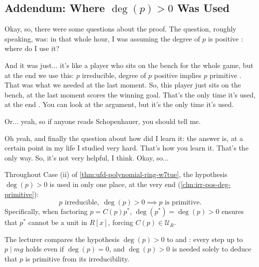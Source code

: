 \subsection{Addendum: Where \texorpdfstring{$\deg(p) > 0$}{deg(p) > 0} Was Used}

\begin{speech}[00:43:02 - 00:44:10]
Okay, so, there were some questions about the proof. The question, roughly speaking, was: in that whole hour, I was assuming the degree of $p$ is positive : where do I use it?

And it was just... it's like a player who sits on the bench for the whole game, but at the end we use this: $p$ irreducible, degree of $p$ positive implies $p$ primitive . That was what we needed at the last moment. So, this player just sits on the bench, at the last moment scores the winning goal. That's the only time it's used, at the end . You can look at the argument, but it's the only time it's used.

Or... yeah, so if anyone reads Schopenhauer, you should tell me.

Oh yeah, and finally the question about how did I learn it: the answer is, at a certain point in my life I studied very hard. That's how you learn it. That's the only way. So, it's not very helpful, I think. Okay, so...
\end{speech}

\begin{content}
Throughout Case (ii) of \cref{thm:ufd-polynomial-ring-w7tue}, the hypothesis $\deg(p) > 0$ is used in only one place, at the very end (\cref{clm:irr-pos-deg-primitive}):
\[
p \text{ irreducible}, \; \deg(p) > 0 \implies p \text{ is primitive}.
\]
Specifically, when factoring $p = C(p) p^*$, $\deg(p^*) = \deg(p) > 0$ ensures that $p^*$ cannot be a unit in $R[x]$, forcing $C(p) \in \mathcal{U}_R$.
\end{content}

\begin{insight}
The lecturer compares the hypothesis $\deg(p) > 0$ to  and : every step up to $p \mid mg$ holds even if $\deg(p) = 0$, and $\deg(p) > 0$ is needed solely to deduce that $p$ is primitive from its irreducibility.
\end{insight}

